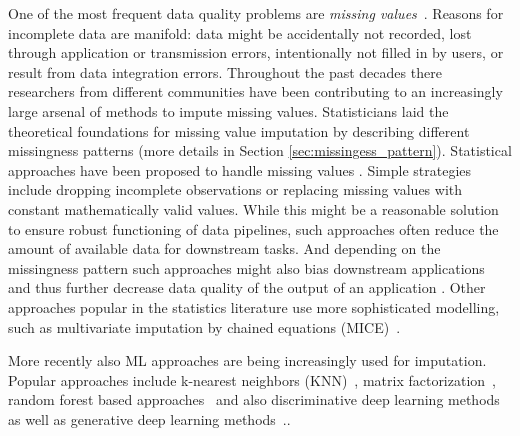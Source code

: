 One of the most frequent data quality problems are \emph{missing values}~\citep{Kumar}. Reasons for incomplete data are manifold: data might be accidentally not recorded, lost through application or transmission errors, intentionally not filled in by users, or result from data integration errors.
%
Throughout the past decades there researchers from different communities have been contributing to an increasingly large arsenal of methods to impute missing values. Statisticians laid the theoretical foundations for missing value imputation \citep{Rubin} by describing different missingness patterns (more details in Section \ref{sec:missingess_pattern}). Statistical approaches have been proposed to handle missing values \citep{Graham}. Simple strategies include dropping incomplete observations or replacing missing values with constant mathematically valid values. While this might be a reasonable solution to ensure robust functioning of data pipelines, such approaches often reduce the amount of available data for downstream tasks. And depending on the missingness pattern such approaches might also bias downstream applications~\citep{Stoyanovich2020,Yang2020} and thus further decrease data quality of the output of an application \citep{Little, Graham}. Other approaches popular in the statistics literature use more sophisticated modelling, such as multivariate imputation by chained equations (MICE)~\citep{Little,vanBuuren2018}.

More recently also ML approaches are being increasingly used for imputation. Popular approaches include k-nearest neighbors (KNN)~\citep{Batista2003}, matrix factorization~\citep{Troyanskaya2001,Koren2009,Mazumder2010}, random forest based approaches~\citep{Stekhoven2012} and also discriminative deep learning methods~\citep{Biessmann2018a} as well as generative deep learning methods~\citep{HIVAE,GAIN}..

%

